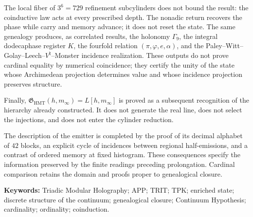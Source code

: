 The local fiber of \(3^6=729\) refinement subcylinders does not bound the
result: the coinductive law acts at every prescribed depth. The nonadic return
recovers the phase while carry and memory advance; it does not reset the
state. The same genealogy produces, as correlated results, the holonomy
\(\Gamma_9\), the integral dodecaphase register \(K\), the fourfold relation
\((\pi,\varphi,e,\alpha)\), and the
Paley--Witt--Golay--Leech--\(V^\natural\)--Monster incidence realization.
These outputs do not prove cardinal equality by numerical coincidence; they
certify the unity of the state whose Archimedean projection determines value
and whose incidence projection preserves structure.

Finally,
\(\mathfrak G_{\mathrm{HMT}}(h,m_\infty)=L[h,m_\infty]\) is proved as a
subsequent recognition of the hierarchy already constructed. It does not
generate the real line, does not select the injections, and does not enter
the cylinder reduction.

\medskip

The description of the emitter is completed by the proof of its decimal
alphabet of \(42\) blocks, an explicit cycle of incidences between
regional half-emissions, and a contrast of ordered memory at fixed
histogram. These consequences specify the information preserved by the
finite readings preceding prolongation. Cardinal comparison retains
the domain and proofs proper to genealogical closure.

\noindent\textbf{Keywords:} Triadic Modular Holography; APP; TRIT; TPK;
enriched state; discrete structure of the continuum; genealogical closure;
Continuum Hypothesis; cardinality; ordinality; coinduction.
\endgroup

